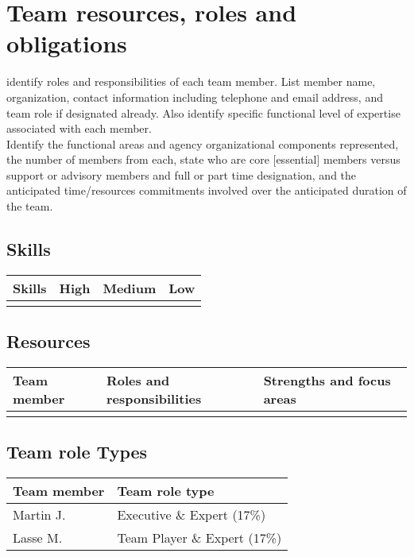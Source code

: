 \section{Team resources, roles and obligations}
identify roles and responsibilities of each team member. List member name, organization, contact
information including telephone and email address, and team role if designated already. Also identify
specific functional level of expertise associated with each member.\\
Identify the functional areas and agency organizational components represented, the number of members
from each, state who are core [essential] members versus support or advisory members and full or part time
designation, and the anticipated time/resources commitments involved over the anticipated duration of the
team.

\subsection{Skills}
\begin{table}
    \centering
    \begin{tabular}{l|l|l|l}
        \rowcolor{Gray}
        \textbf{Skills} & \textbf{High} & \textbf{Medium} & \textbf{Low}\\\hline
                             & & &
    \end{tabular}
    \label{tab:Skillz}
\end{table}

\subsection{Resources}

\begin{table}
    \centering
    \begin{tabular}{l|l|l}
        \rowcolor{Gray}
        \textbf{Team member} & \textbf{Roles and responsibilities} & \textbf{Strengths and focus areas}\\\hline
                             & &
    \end{tabular}
    \label{tab:resources}
\end{table}

\subsection{Team role Types}

\begin{table}
    \centering
    \begin{tabular}{l|l}
        \rowcolor{Gray}
        \textbf{Team member} & \textbf{Team role type}\\\hline
        Martin J.            & Executive \& Expert (17\%) \\
        Lasse M.             & Team Player \& Expert (17\%)
    \end{tabular}
    \label{tab:roleTypes}
\end{table}